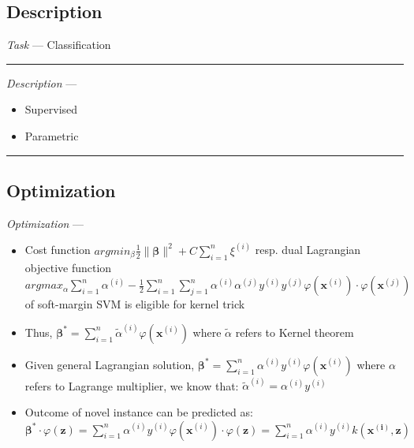 \subsection*{Description}
\emph{Task} --- Classification

{\color{lightgray}\hrule height 0.001mm}

\emph{Description} --- 
\begin{itemize}
    \item Supervised
    \item Parametric
\end{itemize}

{\color{black}\hrule height 0.001mm}

\subsection*{Optimization}
\emph{Optimization} --- 
\begin{itemize}
    \item Cost function $argmin_\beta \frac{1}{2} \| \boldsymbol{\beta} \|^2 + C \sum_{i=1}^n \xi^{(i)}$ resp. dual Lagrangian objective function $argmax_\alpha \sum_{i=1}^n \alpha^{(i)} - \frac{1}{2}  \sum_{i=1}^n  \sum_{j=1}^n \alpha^{(i)}\alpha^{(j)} y^{(i)}y^{(j)} \varphi(\boldsymbol{x}^{(i)}) \cdot \varphi(\boldsymbol{x}^{(j)})$ of soft-margin SVM is eligible for kernel trick
    \item Thus, $\boldsymbol{\beta}^{*} = \sum_{i=1}^n \tilde{\alpha}^{(i)} \varphi(\boldsymbol{x}^{(i)})$ where $\tilde{\alpha}$ refers to Kernel theorem
    \item Given general Lagrangian solution, $\boldsymbol{\beta}^{*} = \sum_{i=1}^n \alpha^{(i)} y^{(i)} \varphi(\boldsymbol{x}^{(i)}) $ where $\alpha$ refers to Lagrange multiplier, we know that: $\tilde{\alpha}^{(i)} = \alpha^{(i)} y^{(i)}$
    \item Outcome of novel instance can be predicted as: $\boldsymbol{\beta}^{*} \cdot \varphi({\boldsymbol{z}}) = \sum_{i=1}^n \alpha^{(i)} y^{(i)} \varphi(\boldsymbol{x}^{(i)}) \cdot \varphi({\boldsymbol{z}}) = \sum_{i=1}^n \alpha^{(i)} y^{(i)} k(\boldsymbol{x^{(i)}}, \boldsymbol{z})$
\end{itemize}